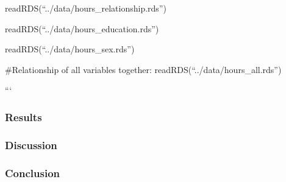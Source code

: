 \documentclass[]{article}
\begin{document}
readRDS(``../data/hours\_relationship.rds'')

readRDS(``../data/hours\_education.rds'')

readRDS(``../data/hours\_sex.rds'')

\#Relationship of all variables together:
readRDS(``../data/hours\_all.rds'')

```

\hypertarget{results}{%
\subsubsection{Results}\label{results}}

\hypertarget{discussion}{%
\subsubsection{Discussion}\label{discussion}}

\hypertarget{conclusion}{%
\subsubsection{Conclusion}\label{conclusion}}
\end{document}
